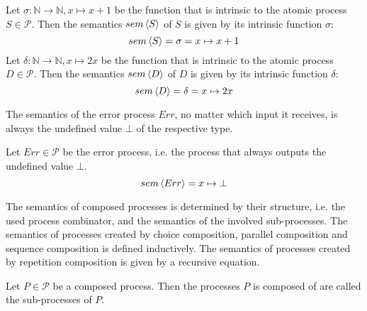 \begin{example}
  \label{exp:sem_atomic}
  Let $\sigma \colon \mathbb{N} \to \mathbb{N}, x \mapsto x+1$ be the function that is intrinsic to the atomic process $S \in \mathcal{P}$. Then the semantics $sem \left\langle S \right\rangle$ of $S$ is given by its intrinsic function $\sigma$:
  \begin{equation*}
    sem \left\langle S \right\rangle = \sigma = x \mapsto x+1
  \end{equation*}
  Let $\delta \colon \mathbb{N} \to \mathbb{N}, x \mapsto 2x$ be the function that is intrinsic to the atomic process $D \in \mathcal{P}$. Then the semantics $sem \left\langle D \right\rangle$ of $D$ is given by its intrinsic function $\delta$:
  \begin{equation*}
    sem \left\langle D \right\rangle = \delta = x \mapsto 2x
  \end{equation*}
\end{example}


The semantics of the error process $Err$, no matter which input it receives, is always the undefined value $\bot$ of the respective type. 
\begin{definition}
\label{def:sem_err}
Let $Err \in \mathcal{P}$ be the error process, i.e. the process that always outputs the undefined value $\bot$.
  \begin{equation*}
    \label{eqn:sem_error}
    sem \left\langle Err \right\rangle = x \mapsto \bot
  \end{equation*}
  \vspace*{-0.5em}
  \hfill\qedsymbol
\end{definition}

The semantics of composed processes is determined by their structure, i.e. the used process combinator, and the semantics of the involved sub-processes. The semantics of processes created by choice composition, parallel composition and sequence composition is defined inductively. The semantics of processes created by repetition composition is given by a recursive equation.

\begin{definition}
Let $P \in \mathcal{P}$ be a composed process. Then the processes $P$ is composed of are called the sub-processes of $P$.

\hfill\qedsymbol
\end{definition}

